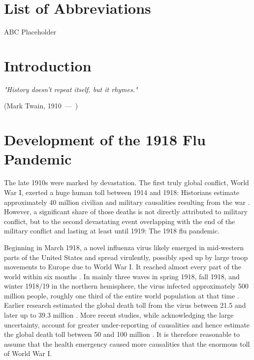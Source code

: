 \documentclass[12pt,a4paper]{article}
\let\oldquote\quote
\let\endoldquote\endquote
\renewenvironment{quote}[2][]
{\if\relax\detokenize{#1}\relax
	\def\quoteauthor{#2}%
	\else
	\def\quoteauthor{#2~---~#1}%
	\fi
	\oldquote}
{\par\nobreak\smallskip\hfill(\quoteauthor)%
	\endoldquote\addvspace{\bigskipamount}}
\begin{document}
\section*{List of Abbreviations}
 
\begin{abbrv}
 
\item[ABC]			Placeholder

 
\end{abbrv}
\newpage
\setcounter{page}{2}
\setlength{\baselineskip}{1.5\baselineskip}
\pagestyle{plain}


\section{Introduction}

\begin{quote}{Mark Twain, 1910}
	\textit{"History doesn't repeat itself, but it rhymes."}
\end{quote}


\section{Development of the 1918 Flu Pandemic}

The late 1910s were marked by devastation.
The first truly global conflict, World War I, exerted a huge human toll between 1914 and 1918:
Historians estimate approximately 40 million civilian and military causalities resulting from the war \citep{royde-smithWorldWarKilled2020}.
However, a significant share of those deaths is not directly attributed to military conflict,
but to the second devastating event overlapping with the end of the military conflict and lasting at least until 1919: The 1918 flu pandemic.

Beginning in March 1918, a novel influenza virus likely emerged in mid-western parts of the United States \citep{barrySiteOrigin19182004} and spread virulently, possibly sped up by large troop movements to Europe due to World War I. It reached almost every part of the world within six months \citep{pattersonGeographyMortality19181991}.
In mainly three waves in spring 1918, fall 1918, and winter 1918/19 in the northern hemisphere, the virus infected approximately 500 million people, roughly one third of the entire world population at that time \citep{taubenberger1918InfluenzaMother2006}.
Earlier research estimated the global death toll from the virus between 21.5 \cite{jordanEpidemicInfluenzaSurvey1927} and later up to 39.3 million \citep{pattersonGeographyMortality19181991}.
More recent studies, while acknowledging the large uncertainty, account for greater under-reporting of causalities and hence estimate the global death toll between 50 and 100 million \citep{johnsonUpdatingAccountsGlobal2002}.
It is therefore reasonable to assume that the health emergency caused more causalities that the enormous toll of World War I.
\end{document}
